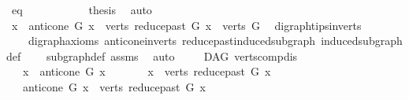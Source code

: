 \begin{isabellebody}
\ eq\isanewline
\ \ \ \ \ \ \ \ \isamarkupfalse%
\ \isamarkupfalse%
\ {\isacharquery}{\kern0pt}thesis\ \isamarkupfalse%
\ auto\isanewline
\ \ \ \ \ \ \isamarkupfalse%
\isanewline
\ \ \ \ \isamarkupfalse%
\isanewline
\ \ \isamarkupfalse%
\ \isanewline
\ \ \ \ \isamarkupfalse%
\ {\isachardoublequoteopen}{\isacharbraceleft}{\kern0pt}x{\isacharbraceright}{\kern0pt}\ {\isasymunion}\ anticone\ G\ x\ {\isasymunion}\ verts\ {\isacharparenleft}{\kern0pt}reduce{\isacharunderscore}{\kern0pt}past\ G\ x{\isacharparenright}{\kern0pt}\ {\isasymsubseteq}\ verts\ G{\isachardoublequoteclose}\ \isamarkupfalse%
\ digraph{\isachardot}{\kern0pt}tips{\isacharunderscore}{\kern0pt}in{\isacharunderscore}{\kern0pt}verts\ \isanewline
\ \ \ \ digraph{\isacharunderscore}{\kern0pt}axioms\ anticone{\isacharunderscore}{\kern0pt}in{\isacharunderscore}{\kern0pt}verts\ reduce{\isacharunderscore}{\kern0pt}past{\isacharunderscore}{\kern0pt}induced{\isacharunderscore}{\kern0pt}subgraph\ induced{\isacharunderscore}{\kern0pt}subgraph{\isacharunderscore}{\kern0pt}def\isanewline
\ \ \ \ subgraph{\isacharunderscore}{\kern0pt}def\ assms\ \isamarkupfalse%
\ auto\isanewline
\ \ \isamarkupfalse%
%
\endisatagproof
{\isafoldproof}%
%
\isadelimproof
\isanewline
%
\endisadelimproof
\isanewline
{}\isamarkupfalse%
\ {\isacharparenleft}{\kern0pt}\ DAG{\isacharparenright}{\kern0pt}\ verts{\isacharunderscore}{\kern0pt}comp{\isacharunderscore}{\kern0pt}dis{\isacharcolon}{\kern0pt}\isanewline
\ \ \ {\isachardoublequoteopen}{\isacharbraceleft}{\kern0pt}x{\isacharbraceright}{\kern0pt}\ {\isasyminter}\ {\isacharparenleft}{\kern0pt}anticone\ G\ x{\isacharparenright}{\kern0pt}\ {\isacharequal}{\kern0pt}\ {\isacharbraceleft}{\kern0pt}{\isacharbraceright}{\kern0pt}{\isachardoublequoteclose}\ \isanewline
\ \ \ {\isachardoublequoteopen}\ {\isacharbraceleft}{\kern0pt}x{\isacharbraceright}{\kern0pt}\ {\isasyminter}\ {\isacharparenleft}{\kern0pt}verts\ {\isacharparenleft}{\kern0pt}reduce{\isacharunderscore}{\kern0pt}past\ G\ x{\isacharparenright}{\kern0pt}{\isacharparenright}{\kern0pt}\ {\isacharequal}{\kern0pt}\ {\isacharbraceleft}{\kern0pt}{\isacharbraceright}{\kern0pt}{\isachardoublequoteclose}\isanewline
\ \ \ {\isachardoublequoteopen}anticone\ G\ x\ {\isasyminter}\ {\isacharparenleft}{\kern0pt}verts\ {\isacharparenleft}{\kern0pt}reduce{\isacharunderscore}{\kern0pt}past\ G\ x{\isacharparenright}{\kern0pt}{\isacharparenright}{\kern0pt}\ {\isacharequal}{\kern0pt}\ {\isacharbraceleft}{\kern0pt}{\isacharbraceright}{\kern0pt}{\isachardoublequoteclose}\isanewline

\end{isabellebody}
